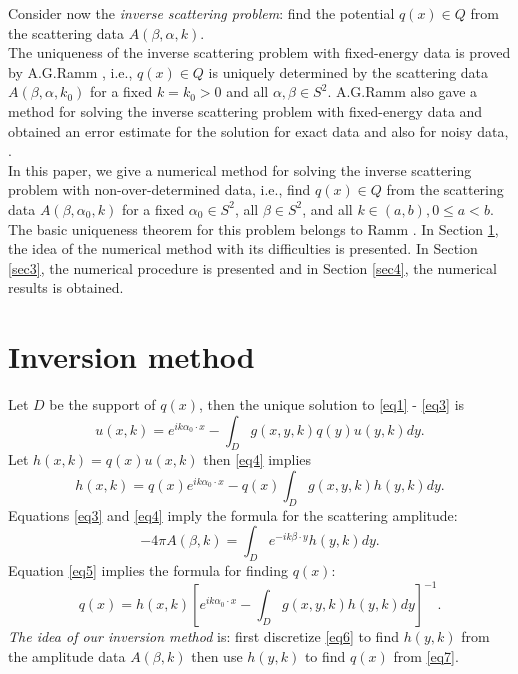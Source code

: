 \documentclass[12pt]{article}
\theoremstyle{plain}
\def\be{\begin{equation}}
\def\ee{\end{equation}}
\begin{document}
Consider now the \textit{inverse scattering problem}: find the potential $q(x) \in Q$ from the scattering data $A(\beta,\alpha,k)$.\\
The uniqueness of the inverse scattering problem with fixed-energy data is proved by A.G.Ramm \cite{R470}, i.e., $q(x) \in Q$ is uniquely determined by the scattering data $A(\beta, \alpha, k_0)$ for a fixed $k = k_0 > 0$ and all $\alpha, \beta \in S^2$. A.G.Ramm also gave a method for solving the inverse scattering problem with fixed-energy data and obtained an error estimate for the solution for exact data and also for noisy data, \cite{R584}.\\

\indent In this paper, we give a numerical method for solving the inverse scattering problem with non-over-determined data, i.e., find $q(x) \in Q$ from the scattering data $A(\beta, \alpha_0, k)$ for a fixed $\alpha_0 \in S^2$, all $\beta \in S^2$, and all $k \in (a,b), 0 \leq a < b$. The basic uniqueness theorem for this problem belongs to Ramm \cite{R603}. In Section \ref{sec2}, the idea of the numerical method with its difficulties is presented. In Section \ref{sec3}, the numerical procedure is presented and in Section \ref{sec4}, the numerical results is obtained.

\section{Inversion method}\label{sec2}
Let $D$ be the support of $q(x)$, then the unique solution to \eqref{eq1} - \eqref{eq3} is
\be\label{eq4}
u(x,k) = e^{ik\alpha_0\cdot x} - \int_D g(x,y,k)q(y)u(y,k)dy.
\ee
Let $h(x,k) = q(x)u(x,k)$ then \eqref{eq4} implies
\be\label{eq5}
h(x,k) = q(x)e^{ik\alpha_0\cdot x} - q(x)\int_D g(x,y,k)h(y,k)dy.
\ee
Equations \eqref{eq3} and \eqref{eq4} imply the formula for the scattering amplitude:
\be\label{eq6}
-4\pi A(\beta, k) = \int_D e^{-ik\beta\cdot y} h(y,k)dy.
\ee
Equation \eqref{eq5} implies the formula for finding $q(x)$:
\be\label{eq7}
q(x) = h(x,k)[e^{ik\alpha_0\cdot x} - \int_D g(x,y,k)h(y,k)dy]^{-1}.
\ee
\textit{The idea of our inversion method} is: first discretize \eqref{eq6} to find $h(y,k)$ from the amplitude data $A(\beta, k)$ then use $h(y,k)$ to find $q(x)$ from \eqref{eq7}.\\
\end{document}
